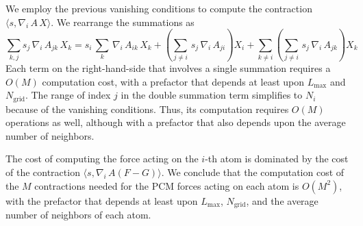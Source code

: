 \documentclass[aip,jcp,a4paper,11pt]{revtex4-1}
\newcommand{\nablai}{\nabla_{\!i}\,}
\begin{document}
We employ the previous vanishing conditions to compute the contraction $\langle s , \nablai A\,X \rangle$. We rearrange the summations as
\[
	\sum_{k,j} s_j \, \nablai A_{jk} \, X_k 
	=  s_i \, \sum_k \, \nablai A_{ik} \, X_k 
	+ \left(\sum_{j \not=i} \, s_j \, \nablai A_{ji}  \right) X_i 
	+ \sum_{k\not=i}  \left(\sum_{j\not=i} \, s_j \, \nablai A_{jk}\right) X_k
\]
Each term on the right-hand-side that involves a single summation requires a $O(M)$ computation cost, with a prefactor that depends at least upon $L_\text{max}$ and $N_\text{grid}$. The range of index $j$ in the double summation term simplifies to $N_i$ because of the vanishing conditions. Thus, its computation requires $O(M)$ operations as well, although with a prefactor that also depends upon the average number of neighbors.

The cost of computing the force acting on the $i$-th atom is dominated by the cost of the contraction $\langle s , \nablai  A ( F - G ) \rangle$. We conclude that the computation cost of the $M$ contractions needed for the PCM forces acting on each atom is $O(M^2)$, with the prefactor that depends at least upon $L_\text{max}$, $N_\text{grid}$, and the average number of neighbors of each atom.


%
\end{document}
